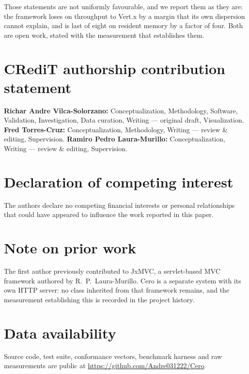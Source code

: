 \documentclass[preprint,12pt]{elsarticle}
\begin{document}
Those statements are not uniformly favourable, and we report them as they are:
the framework loses on throughput to Vert.x by a margin that its own dispersion
cannot explain, and is last of eight on resident memory by a factor of four.
Both are open work, stated with the measurement that establishes them.

\section*{CRediT authorship contribution statement}

\textbf{Richar Andre Vilca-Solorzano:} Conceptualization, Methodology,
Software, Validation, Investigation, Data curation, Writing --- original draft,
Visualization. \textbf{Fred Torres-Cruz:} Conceptualization, Methodology,
Writing --- review \& editing, Supervision. \textbf{Ramiro Pedro
Laura-Murillo:} Conceptualization, Writing --- review \& editing, Supervision.

\section*{Declaration of competing interest}

The authors declare no competing financial interests or personal relationships
that could have appeared to influence the work reported in this paper.

\section*{Note on prior work}

The first author previously contributed to JxMVC, a servlet-based MVC framework
authored by R.~P.~Laura-Murillo. Cero is a separate system with its own HTTP
server: no class inherited from that framework remains, and the measurement
establishing this is recorded in the project history.

\section*{Data availability}

Source code, test suite, conformance vectors, benchmark harness and raw
measurements are public at \url{https://github.com/Andre031222/Cero}.



\end{document}

